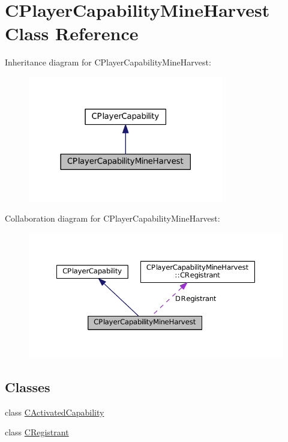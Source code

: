 \hypertarget{classCPlayerCapabilityMineHarvest}{}\section{C\+Player\+Capability\+Mine\+Harvest Class Reference}
\label{classCPlayerCapabilityMineHarvest}


Inheritance diagram for C\+Player\+Capability\+Mine\+Harvest\+:
\nopagebreak
\begin{figure}[H]
\begin{center}
\leavevmode
\includegraphics[width=242pt]{classCPlayerCapabilityMineHarvest__inherit__graph}
\end{center}
\end{figure}


Collaboration diagram for C\+Player\+Capability\+Mine\+Harvest\+:
\nopagebreak
\begin{figure}[H]
\begin{center}
\leavevmode
\includegraphics[width=350pt]{classCPlayerCapabilityMineHarvest__coll__graph}
\end{center}
\end{figure}
\subsection*{Classes}
\begin{DoxyCompactItemize}
\item 
class \hyperlink{classCPlayerCapabilityMineHarvest_1_1CActivatedCapability}{C\+Activated\+Capability}
\item 
class \hyperlink{classCPlayerCapabilityMineHarvest_1_1CRegistrant}{C\+Registrant}
\end{DoxyCompactItemize}
